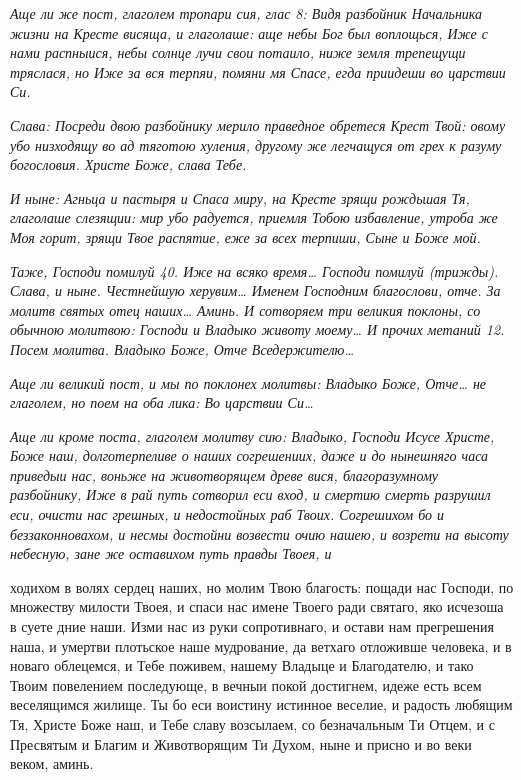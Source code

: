  \itshape Аще ли же пост, глаголем тропари сия, глас 8:\normalfont{} Видя разбойник
Начальника жизни на Кресте висяща, и глаголаше: аще небы Бог был
воплощься, Иже с нами распныися, небы солнце лучи свои потаило, ниже
земля трепещущи тряслася, но Иже за вся терпяи, помяни мя Спасе, егда
приидеши во царствии Си.


 \itshape Слава:\normalfont{} Посреди двою разбойнику мерило праведное обретеся Крест Твой:
овому убо низходящу во ад тяготою хуления, другому же легчащуся от грех
к разуму богословия. Христе Боже, слава Тебе.


 \itshape И ныне:\normalfont{} Агньца и пастыря и Спаса миру, на Кресте зрящи рождьшая Тя,
глаголаше слезящии: мир убо радуется, приемля Тобою избавление, утроба
же Моя горит, зрящи Твое распятие, еже за всех терпиши, Сыне и Боже
мой.


 \itshape Таже,\normalfont{} Господи помилуй \itshape 40\normalfont{}. Иже на всяко время… Господи помилуй
\itshape (трижды)\normalfont{}. \itshape Слава, и ныне\normalfont{}. Честнейшую херувим… Именем Господним
благослови, отче. За молитв святых отец наших… Аминь. \itshape И сотворяем три
великия поклоны, со обычною молитвою:\normalfont{} Господи и Владыко животу
моему… \itshape И прочих метаний 12. Посем молитва.\normalfont{} Владыко Боже, Отче
Вседержителю…


 \itshape Аще ли великий пост, и мы по поклонех молитвы:\normalfont{} Владыко Боже, Отче…
\itshape не глаголем, но поем на оба лика:\normalfont{} Во царствии Си…


 \itshape Аще ли кроме поста, глаголем молитву сию:\normalfont{} Владыко, Господи Исусе
Христе, Боже наш, долготерпеливе о наших согрешениих, даже и до
нынешняго часа приведыи нас, воньже на животворящем древе вися,
благоразумному разбойнику, Иже в рай путь сотворил еси вход, и смертию
смерть разрушил еси, очисти нас грешных, и недостойных раб Твоих.
Согрешихом бо и беззаконновахом, и несмы достойни возвести очию нашею,
и возрети на высоту небесную, зане же оставихом путь правды Твоея, и

ходихом в волях сердец наших, но молим Твою благость: пощади нас
Господи, по множеству милости Твоея, и спаси нас имене Твоего ради
святаго, яко исчезоша в суете дние наши. Изми нас из руки сопротивнаго, и
остави нам прегрешения наша, и умертви плотьское наше мудрование, да
ветхаго отложивше человека, и в новаго облецемся, и Тебе поживем, нашему
Владыце и Благодателю, и тако Твоим повелением последующе, в вечныи
покой достигнем, идеже есть всем веселящимся жилище. Ты бо еси
воистину истинное веселие, и радость любящим Тя, Христе Боже наш, и
Тебе славу возсылаем, со безначальным Ти Отцем, и с Пресвятым и
Благим и Животворящим Ти Духом, ныне и присно и во веки веком,
аминь.

